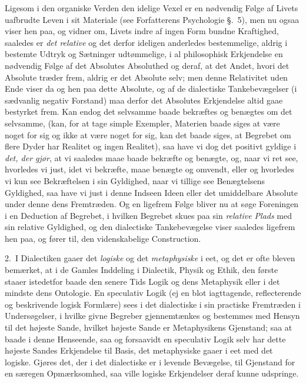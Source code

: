 \documentclass[12pt,a4paper]{book}
\newcommand{\apage}[1]{\marginnote{\footnotesize\textit{[#1]}}}
\begin{document}
Ligesom i den organiske Verden den idelige Vexel er en nødvendig Følge af Livets
uafbrudte Leven i sit Materiale (see Forfatterens Psychologie §.~5), men nu ogsaa
viser hen paa, og vidner om, Livets indre af ingen Form bundne Kraftighed,
saaledes er \emph{det relative} og det derfor ideligen anderledes bestemmelige,
aldrig i bestemte Udtryk og Sætninger udtømmelige, i al philosophisk Erkjendelse
en nødvendig Følge af det Absolutes Absoluthed og deraf, at det Andet, hvori det
Absolute træder frem, aldrig er det Absolute selv; men denne Relativitet uden Ende
viser da og hen paa dette Absolute, og af de dialectiske Tankebevægelser (i
sædvanlig negativ Forstand) maa derfor det Absolutes Erkjendelse altid gaae
bestyrket frem. Kan endog det selvsamme baade bekræftes og benægtes om det
selvsamme, (kan, for at tage simple Exempler, Materien baade siges at være noget
for sig og ikke at være noget for sig, kan det baade siges, at Begrebet om flere
Dyder har Realitet og ingen Realitet), saa have  \apage{131} vi dog det positivt gyldige i \emph{det,
der gjør}, at vi saaledes maae baade bekræfte og benægte, og, naar vi ret see,
hvorledes vi just, idet vi bekræfte, maae benægte og omvendt, eller og hvorledes
vi kun see Bekræftelsen i sin Gyldighed, naar vi tillige see Benægtelsens
Gyldighed, saa have vi just i denne Indseen Ideen eller det umiddelbare Absolute
under denne dens Fremtræden. Og en ligefrem Følge bliver nu at søge Foreningen i
en Deduction af Begrebet, i hvilken Begrebet skues paa sin \emph{relative Plads}
med sin relative Gyldighed, og den dialectiske Tankebevægelse viser saaledes
ligefrem hen paa, og fører til, den videnskabelige Construction.

2.~I Dialectiken gaaer det \emph{logiske} og det \emph{metaphysiske} i eet, og det
er ofte bleven bemærket, at i de Gamles Inddeling i Dialectik, Physik og Ethik,
den første staaer istedetfor baade den senere Tids Logik og dens Metaphysik eller
i det mindste dens Ontologie. En speculativ Logik (ej en blot iagttagende,
reflecterende og beskrivende logisk Formlære) sees i det dialectiske i sin
practiske Fremtræden i Undersøgelser, i hvilke givne Begreber gjennemtænkes og
bestemmes med Hensyn til det højeste Sande, hvilket højeste Sande er
Metaphysikens Gjenstand; saa at baade i denne Henseende, saa og forsaavidt en
speculativ Logik selv har dette højeste Sandes Erkjendelse til \apage{132}  Basis, det
metaphysiske gaaer i eet med det logiske. Gjøres det, der i det dialectiske er i
levende Bevægelse, til Gjenstand for en særegen Opmærksomhed, saa ville logiske
Erkjendelser deraf kunne udspringe.
\end{document}
